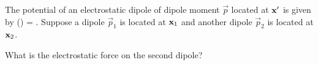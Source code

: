 \newcommand{\vp}{\vec{p}}
\newcommand{\vpq}{\vp_1}
\newcommand{\vpw}{\vp_2}
\newcommand{\vxq}{\vx_1}
\newcommand{\vxw}{\vx_2}
\newcommand{\Qq}{Q_1}
\newcommand{\Qw}{Q_2}
\newcommand{\phiq}{\phi_1}
\newcommand{\phiw}{\phi_2}
\newcommand{\vdq}{\vec{d}_1}
\newcommand{\vdw}{\vec{d}_2}
\newcommand{\vF}{\vec{F}}
\newcommand{\vEo}{\vE_0}

\newcommand{\rhow}{\rho_2}
\newcommand{\vEq}{\vE_1}
\newcommand{\pq}{p_1}
\newcommand{\rhh}{\vec{\hat{r}}}
\newcommand{\phh}{\boldsymbol{\hat{\varphi}}}
\newcommand{\thh}{\boldsymbol{\hat{\theta}}}

\begin{statement}{}
	The potential of an electrostatic dipole of dipole moment $\vp$ located at $\mathbf{x}'$ is given by
	\beqn \label{pot1}
		\phi(\vx) = \frac{\vp \cdot (\vx - \vx')}{|\vx - \vx'|^3}.
	\eeqn
	Suppose a dipole $\vpq$ is located at $\vxq$ and another dipole $\vpw$ is located at $\vxw$.
\end{statement}

\begin{problem} \label{3a}
	What is the electrostatic force on the second dipole?
\end{problem}

